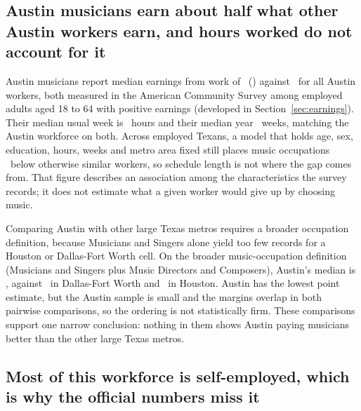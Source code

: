 \subsection*{Austin musicians earn about half what other Austin workers earn, and hours worked do not account for it}

Austin musicians report median earnings from work of \NPumsAustinMusMedpernpPos\
(\NPumsAustinMusMedpernpPosMoe) against \NPumsAustinAllworkMedpernpPos\ for all
Austin workers, both measured in the American Community Survey among employed
adults aged 18 to 64 with positive earnings (developed in Section~\ref{sec:earnings}). Their median usual week is
\NPumsAustinMusMedwkhp\ hours and their median year \NPumsAustinMusMedwkwn\
weeks, matching the Austin workforce on both. Across employed Texans, a model
that holds age, sex, education, hours, weeks and metro area fixed still places
music occupations \NPumsRegMusicPctgap\ below otherwise similar workers, so
schedule length is not where the gap comes from. That figure describes an
association among the characteristics the survey records; it does not estimate
what a given worker would give up by choosing music.

Comparing Austin with other large Texas metros requires a broader occupation
definition, because Musicians and Singers alone yield too few records for a
Houston or Dallas-Fort Worth cell. On the broader music-occupation definition
(Musicians and Singers plus Music Directors and Composers), Austin's median is
\NPumsMetroAustinMusicMedpernp, against \NPumsMetroDfwMusicMedpernp\ in
Dallas-Fort Worth and \NPumsMetroHoustonMusicMedpernp\ in Houston. Austin has
the lowest point estimate, but the Austin sample is small and the margins
overlap in both pairwise comparisons, so the ordering is not statistically firm.
These comparisons support one narrow conclusion: nothing in them shows Austin
paying musicians better than the other large Texas metros.

\subsection*{Most of this workforce is self-employed, which is why the official numbers miss it}


